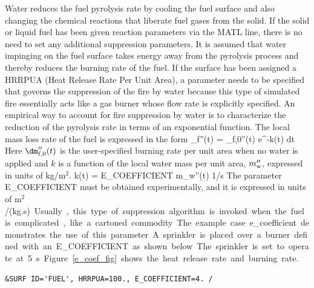 \documentclass[11pt]{book}
\begin{document}
Water reduces the fuel pyrolysis rate by cooling the fuel surface and also
changing the chemical reactions that liberate fuel gases from the solid.
If the solid or liquid fuel has been given reaction parameters via the {\ct MATL} line, there is no
need to set any additional suppression parameters. It is assumed that
water impinging on the fuel surface takes energy away from the
pyrolysis process and thereby reduces the burning rate of the fuel.
If the surface has been assigned a {\ct HRRPUA} (Heat Release Rate Per Unit Area),
a parameter needs to be specified that governs the suppression of the fire by water because this type of simulated
fire essentially acts like a gas burner whose flow rate is explicitly specified.
An empirical way to account for fire suppression by water
is to characterize the reduction of the pyrolysis rate in terms
of an exponential function. The local mass loss rate of the
fuel is expressed in the form
\be
   \dm_{\rm f}''(t) = \dm_{\rm f,0}''(t) \; {\rm e}^{-\int k(t) \; dt} \label{nistexting}
\ee
Here $\dm_{\rm f,0}''(t)$ is the user-specified burning rate per unit
area when no water is applied and $k$ is a function of the local water
mass per unit area, $m_{\rm w}''$, expressed in units of kg/m$^2$.
\be
k(t) = \hbox{\ct E\_COEFFICIENT} \; m_{\rm w}''(t) \quad          \si{1/s}
\ee
The parameter {\ct E\_COEFFICIENT} must be obtained experimentally, and it is expressed in units of \si{m$^2$/(kg.s)}. Usually, this type of suppression algorithm is invoked when the fuel is complicated, like a cartoned commodity.  The example case {\ct e\_coefficient} demonstrates the use of this parameter.  A sprinkler is placed over a burner defined with an {\ct E\_COEFFICIENT} as shown below.  The sprinkler is set to operate at 5~s.  Figure~\ref{e_coef_fig} shows the heat release rate and burning rate.

\begin{lstlisting}
&SURF ID='FUEL', HRRPUA=100., E_COEFFICIENT=4. /
\end{lstlisting}
\end{document}
